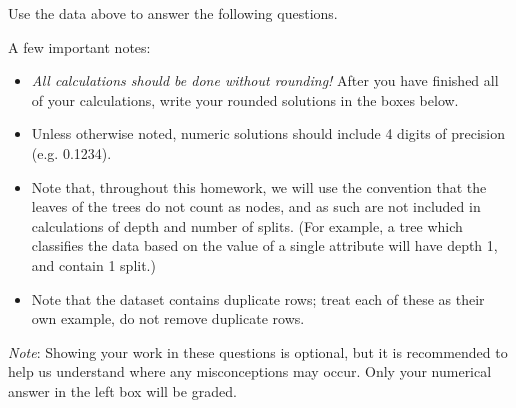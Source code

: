 \documentclass[11pt,addpoints,answers]{exam}
\begin{document}
\begin{questions}
Use the data above to answer the following questions. 

A few important notes:
\begin{itemize}
    \item \emph{All calculations should be done without rounding!} After you have finished all of your calculations, write your rounded solutions in the boxes below.
    \item Unless otherwise noted, numeric solutions should include 4 digits of precision (e.g. 0.1234).
    \item Note that, throughout this homework, we will use the convention that the leaves of the trees do not count as nodes, and as such are not included in calculations of depth and number of splits. (For example, a tree which classifies the data based on the value of a single attribute will have depth 1, and contain 1 split.)
    \item Note that the dataset contains duplicate rows; treat each of these as their own example, do not remove duplicate rows.
\end{itemize}

\textit{Note}: Showing your work in these questions is optional, but it is recommended to help us understand where any misconceptions may occur. Only your numerical answer in the left box will be graded.


\clearpage
    
\end{questions}
\end{document}
